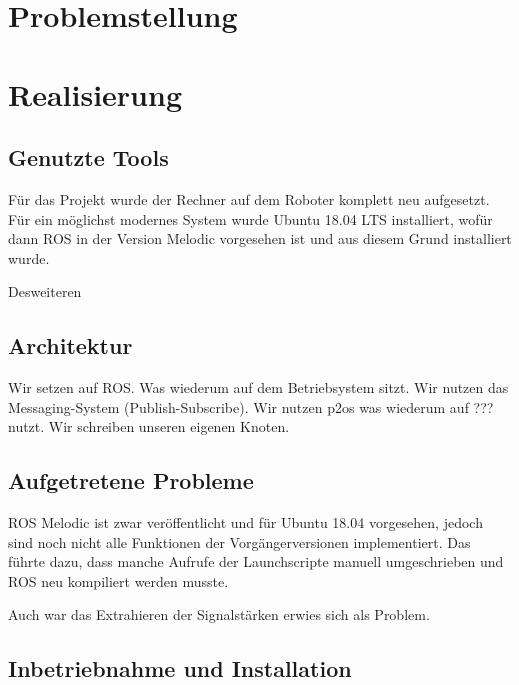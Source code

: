 \documentclass{scrartcl}%
\begin{document}
\newpage
\section{Problemstellung}

\newpage
\section{Realisierung}
\subsection{Genutzte Tools}
Für das Projekt wurde der Rechner auf dem Roboter komplett neu aufgesetzt. Für ein möglichst modernes System wurde Ubuntu 18.04 LTS installiert, wofür dann ROS in der Version Melodic vorgesehen ist und aus diesem Grund installiert wurde.

Desweiteren 


\subsection{Architektur}
Wir setzen auf ROS. Was wiederum auf dem Betriebsystem sitzt. Wir nutzen das Messaging-System (Publish-Subscribe). Wir nutzen p2os was wiederum auf ??? nutzt. Wir schreiben unseren eigenen Knoten.

\subsection{Aufgetretene Probleme}
ROS Melodic ist zwar veröffentlicht und für Ubuntu 18.04 vorgesehen, jedoch sind noch nicht alle Funktionen der Vorgängerversionen implementiert. Das führte dazu, dass manche Aufrufe der Launchscripte manuell umgeschrieben und ROS neu kompiliert werden musste.

Auch war das Extrahieren der Signalstärken erwies sich als Problem.

\subsection{Inbetriebnahme und Installation}
\end{document}
